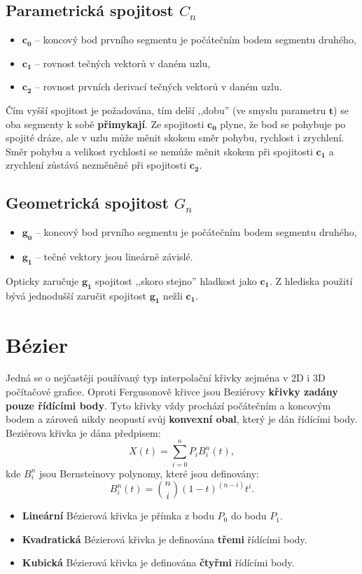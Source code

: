 \subsection{Parametrická spojitost $C_n$}
\begin{itemize}
    \item $\mathbf{c_0}$ -- koncový bod prvního segmentu je počátečním bodem segmentu druhého,
    \item $\mathbf{c_1}$ -- rovnost tečných vektorů v daném uzlu,
    \item $\mathbf{c_2}$ -- rovnost prvních derivací tečných vektorů v daném uzlu.
\end{itemize}
Čím vyšší spojitost je požadována, tím delší ,,dobu'' (ve smyslu parametru $\mathbf{t}$) se oba segmenty k sobě \textbf{přimykají}. Ze spojitosti $\mathbf{c_0}$ plyne, že bod se pohybuje po spojité dráze, ale v uzlu může měnit skokem směr pohybu, rychlost i zrychlení. Směr pohybu a velikost rychlosti se nemůže měnit skokem při spojitosti $\mathbf{c_1}$ a zrychlení zůstává nezměněné při spojitosti $\mathbf{c_2}$.

\subsection{Geometrická spojitost $G_n$}
\begin{itemize}
    \item $\mathbf{g_0}$ -- koncový bod prvního segmentu je počátečním bodem segmentu druhého,
    \item $\mathbf{g_1}$ -- tečné vektory jsou lineárně závislé.
\end{itemize}
Opticky zaručuje $\mathbf{g_1}$ spojitost ,,skoro stejno'' hladkost jako $\mathbf{c_1}$. Z hlediska použití bývá jednodušší zaručit spojitost $\mathbf{g_1}$ nežli $\mathbf{c_1}$.

\section{Bézier}
Jedná se o nejčastěji používaný typ interpolační křivky zejména v 2D i 3D počítačové grafice. Oproti Fergusonově křivce jsou Beziérovy \textbf{křivky zadány pouze řídícími body}. Tyto křivky vždy prochází počátečním a koncovým bodem a zároveň nikdy neopustí svůj \textbf{konvexní obal}, který je dán řídícími body. Beziérova křivka je dána předpisem:
\begin{equation*}\label{rovnice_bezier}
    X(t) = \sum_{i=0}^{n}P_iB_i^n(t),
\end{equation*}
kde $B_i^n$ jsou Bernsteinovy polynomy, které jsou definovány:
\begin{equation*}
    B_i^n(t) = \binom{n}{i}(1 - t)^{(n - i)}t^i.
\end{equation*}
\begin{itemize}
    \item \textbf{Lineární} Bézierová křivka je přímka z bodu $P_{0}$ do bodu $P_{1}$.
    \item \textbf{Kvadratická} Bézierová křivka je definována \textbf{třemi} řídícími body.
    \item \textbf{Kubická} Bézierová křivka je definována \textbf{čtyřmi} řídícími body.
\end{itemize}


